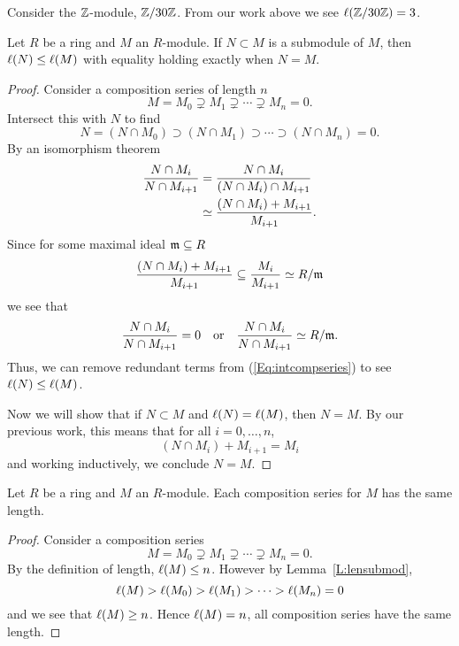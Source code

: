 \documentclass{ximera}
\begin{document}
\begin{example}
  Consider the $\mathbb Z$-module, $\mathbb Z/30\mathbb Z$. From our work above we see $\ell(\mathbb Z/30\mathbb Z) = 3$.
\end{example}



\begin{lemma}\label{L:lensubmod}
  Let $R$ be a ring and $M$ an $R$-module. If $N\subset M$ is a
  submodule of $M$, then $\ell(N)\le\ell(M)$ with equality holding exactly
  when $N=M$.
  \begin{proof}
    Consider a composition series of length $n$
    \[
    M = M_0 \supsetneq M_1 \supsetneq \cdots \supsetneq M_n = 0.
    \]
    Intersect this with $N$ to find
    \begin{equation}\tag{$\bigstar$}\label{Eq:intcompseries}
    N = (N\cap M_0) \supset (N\cap M_1) \supset \cdots \supset (N\cap M_n) = 0.
    \end{equation}
    By an isomorphism theorem
    \begin{align*}
      \frac{N\cap M_i}{N\cap M_{i+1}} &= \frac{N\cap M_i}{(N\cap M_i)\cap M_{i+1}} \\
      &\simeq \frac{(N\cap M_i) + M_{i+1}}{M_{i+1}}.
    \end{align*}
    Since for some maximal ideal $\mathfrak{m}\subseteq R$
    \[
    \frac{(N\cap M_i) + M_{i+1}}{M_{i+1}} \subseteq \frac{M_i}{M_{i+1}}\simeq R/\mathfrak{m}
    \]
    we see that
    \[
    \frac{N\cap M_i}{N\cap M_{i+1}}  = 0 \quad \text{or}\quad \frac{N\cap M_i}{N\cap M_{i+1}} \simeq R/\mathfrak{m}.
    \]
    Thus, we can remove redundant terms from (\ref{Eq:intcompseries})
    to see $\ell(N)\le \ell(M)$.

    Now we will show that if $N\subset M$ and $\ell(N) = \ell(M)$, then $N
    = M$. By our previous work, this means that for all $i = 0,\dots,
    n$,
    \[
    (N\cap M_i) + M_{i+1} = M_i
    \]
    and working inductively, we conclude $N=M$.
  \end{proof}
\end{lemma}



\begin{theorem}
  Let $R$ be a ring and $M$ an $R$-module. Each composition series for
  $M$ has the same length.
  \begin{proof}
    Consider a composition series
    \[
    M = M_0\supsetneq M_1 \supsetneq \cdots \supsetneq M_n = 0.
    \]
    By the definition of length, $\ell(M) \le n$. However by
    Lemma~\ref{L:lensubmod},
    \[
    \ell(M) > \ell(M_0) > \ell(M_1) > \dots > \ell(M_n) =0
    \]
    and we see that $\ell(M) \ge n$. Hence $\ell(M) = n$, all composition
    series have the same length.
  \end{proof}
\end{theorem}
\end{document}
